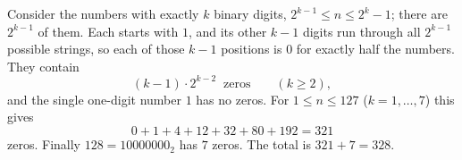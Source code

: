 Consider the numbers with exactly $k$ binary digits, $2^{k-1}\le n\le2^k-1$; there are $2^{k-1}$ of them. Each starts with $1$, and its other $k-1$ digits run through all $2^{k-1}$ possible strings, so each of those $k-1$ positions is $0$ for exactly half the numbers. They contain
\[
(k-1)\cdot2^{k-2}\ \text{ zeros}\qquad(k\ge2),
\]
and the single one-digit number $1$ has no zeros. For $1\le n\le127$ ($k=1,\dots,7$) this gives
\[
0+1+4+12+32+80+192=321
\]
zeros. Finally $128=10000000_2$ has $7$ zeros. The total is $321+7=\boxed{328}$.
